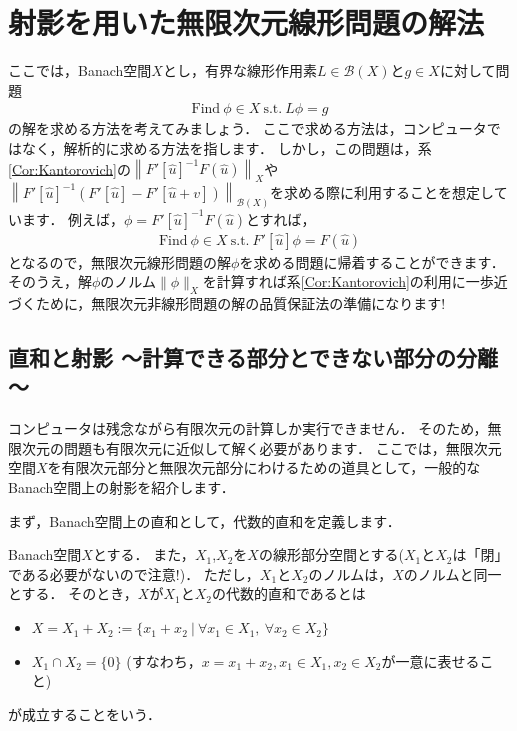 \chapter{射影を用いた無限次元線形問題の解法}\label{sec:infinite_dimensional}
ここでは，Banach空間$X$とし，有界な線形作用素$L \in {\mathcal B}(X)$と$g \in X$に対して問題
\begin{align}
	\label{eq:infinite_linear_prog}
	\mbox{Find} ~ \phi \in X ~ \mbox{s.t.} ~ L \phi = g
\end{align}
の解を求める方法を考えてみましょう．
ここで求める方法は，コンピュータではなく，解析的に求める方法を指します．
しかし，この問題は，系\ref{Cor:Kantorovich}の$\left\| F'[\hat{u}]^{-1} F(\hat{u}) \right\|_X$や\\
$\left\| F'[\hat{u}]^{-1} \left( F'[\hat{u}] -  F'[\hat{u} + v] \right) \right\|_{{\mathcal B}(X)}$を求める際に利用することを想定しています．
例えば，$\phi = F'[\hat{u}]^{-1} F(\hat{u})$とすれば，
\begin{align*}
	\mbox{Find} ~ \phi \in X ~ \mbox{s.t.} ~ F'[\hat{u}] \phi = F(\hat{u})
\end{align*}
となるので，無限次元線形問題の解$\phi$を求める問題に帰着することができます．
そのうえ，解$\phi$のノルム$\| \phi \|_X$を計算すれば系\ref{Cor:Kantorovich}の利用に一歩近づくために，無限次元非線形問題の解の品質保証法の準備になります!


%
\section{直和と射影 ～計算できる部分とできない部分の分離～}
コンピュータは残念ながら有限次元の計算しか実行できません．
そのため，無限次元の問題も有限次元に近似して解く必要があります．
ここでは，無限次元空間$X$を有限次元部分と無限次元部分にわけるための道具として，一般的なBanach空間上の射影を紹介します．

まず，Banach空間上の直和として，代数的直和を定義します．

\begin{defi}[代数的直和]
	Banach空間$X$とする．
	また，$X_1$,$X_2$を$X$の線形部分空間とする($X_1$と$X_2$は「閉」である必要がないので注意!)．
	ただし，$X_1$と$X_2$のノルムは，$X$のノルムと同一とする．
	そのとき，$X$が$X_1$と$X_2$の代数的直和であるとは
	\begin{itemize}
		\item $X = X_1 + X_2 := \{ x_1 + x_2 ~ | ~ \forall x_1 \in X_1, ~ \forall x_2 \in X_2 \}$
		\item $X_1 \cap X_2 = \{ 0 \}$ (すなわち，$x = x_1 + x_2, x_1 \in X_1, x_2 \in X_2$が一意に表せること)
	\end{itemize}
	が成立することをいう．
\end{defi}


